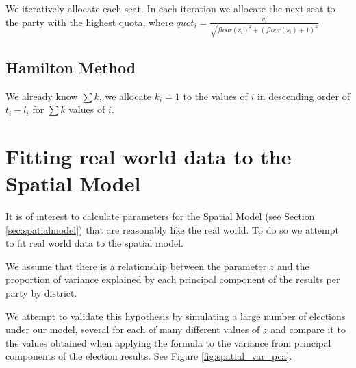\documentclass{article}
\begin{document}
We iteratively allocate each seat. In each iteration we allocate the next seat to the party with the highest quota, where $quot_i=\frac{v_i}{\sqrt{floor(s_i)^2+(floor(s_i)+1)^2}}$
\subsection{Hamilton Method}
We already know $\sum k$, we allocate $k_i=1$ to the values of $i$ in descending order of $t_i-l_i$ for $\sum k$ values of $i$.

\section{Fitting real world data to the Spatial Model}
\label{fittingrealworldENI}
It is of interest to calculate parameters for the Spatial Model (see Section \ref{sec:spatialmodel}) that are reasonably like the real world. To do so we attempt to fit real world data to the spatial model.

We assume that there is a relationship between the parameter $z$ and the proportion of variance explained by each principal component of the results per party by district. 


We attempt to validate this hypothesis by simulating a large number of elections under our model, several for each of many different values of $z$ and compare it to the values obtained when applying the formula to the variance from principal components of the election results. See Figure \ref{fig:spatial_var_pca}. %
\end{document}
